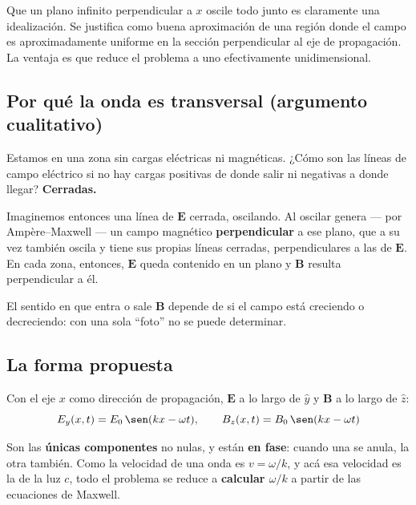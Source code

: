 \documentclass[12pt,a4paper]{article}
\begin{document}
\begin{notebox}
Que un plano infinito perpendicular a $x$ oscile todo junto es claramente una
idealización. Se justifica como buena aproximación de una región donde el
campo es aproximadamente uniforme en la sección perpendicular al eje de
propagación. La ventaja es que reduce el problema a uno efectivamente
unidimensional.
\end{notebox}

\subsection{Por qué la onda es transversal (argumento cualitativo)}

Estamos en una zona sin cargas eléctricas ni magnéticas. ¿Cómo son las líneas
de campo eléctrico si no hay cargas positivas de donde salir ni negativas a
donde llegar? \textbf{Cerradas.}

Imaginemos entonces una línea de $\mathbf{E}$ cerrada, oscilando. Al oscilar
genera --- por Ampère--Maxwell --- un campo magnético \textbf{perpendicular}
a ese plano, que a su vez también oscila y tiene sus propias líneas cerradas,
perpendiculares a las de $\mathbf{E}$. En cada zona, entonces, $\mathbf{E}$
queda contenido en un plano y $\mathbf{B}$ resulta perpendicular a él.

\begin{warnbox}
El sentido en que entra o sale $\mathbf{B}$ depende de si el campo está
creciendo o decreciendo: con una sola \enquote{foto} no se puede determinar.
\end{warnbox}

\subsection{La forma propuesta}

Con el eje $x$ como dirección de propagación, $\mathbf{E}$ a lo largo de
$\hat{y}$ y $\mathbf{B}$ a lo largo de $\hat{z}$:
\[
E_y(x,t) = E_0\,\sen(kx - \omega t), \qquad
B_z(x,t) = B_0\,\sen(kx - \omega t)
\]



Son las \textbf{únicas componentes} no nulas, y están \textbf{en fase}:
cuando una se anula, la otra también. Como la velocidad de una onda es
$v = \omega/k$, y acá esa velocidad es la de la luz $c$, todo el problema se
reduce a \textbf{calcular $\omega/k$} a partir de las ecuaciones de Maxwell.
\end{document}
